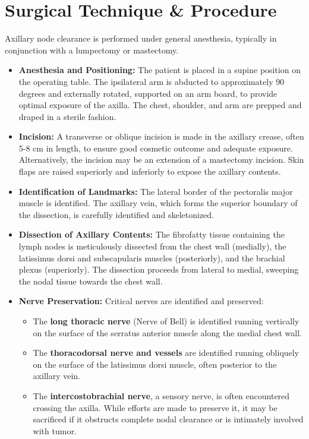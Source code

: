 \section*{Surgical Technique \& Procedure}
Axillary node clearance is performed under general anesthesia, typically in conjunction with a lumpectomy or mastectomy.

\begin{itemize}
  \item \textbf{Anesthesia and Positioning:} The patient is placed in a supine position on the operating table. The ipsilateral arm is abducted to approximately 90 degrees and externally rotated, supported on an arm board, to provide optimal exposure of the axilla. The chest, shoulder, and arm are prepped and draped in a sterile fashion.
  \item \textbf{Incision:} A transverse or oblique incision is made in the axillary crease, often 5-8 cm in length, to ensure good cosmetic outcome and adequate exposure. Alternatively, the incision may be an extension of a mastectomy incision. Skin flaps are raised superiorly and inferiorly to expose the axillary contents.
  \item \textbf{Identification of Landmarks:} The lateral border of the pectoralis major muscle is identified. The axillary vein, which forms the superior boundary of the dissection, is carefully identified and skeletonized.
  \item \textbf{Dissection of Axillary Contents:} The fibrofatty tissue containing the lymph nodes is meticulously dissected from the chest wall (medially), the latissimus dorsi and subscapularis muscles (posteriorly), and the brachial plexus (superiorly). The dissection proceeds from lateral to medial, sweeping the nodal tissue towards the chest wall.
  \item \textbf{Nerve Preservation:} Critical nerves are identified and preserved:
    \begin{itemize}
      \item The \textbf{long thoracic nerve} (Nerve of Bell) is identified running vertically on the surface of the serratus anterior muscle along the medial chest wall.
      \item The \textbf{thoracodorsal nerve and vessels} are identified running obliquely on the surface of the latissimus dorsi muscle, often posterior to the axillary vein.
      \item The \textbf{intercostobrachial nerve}, a sensory nerve, is often encountered crossing the axilla. While efforts are made to preserve it, it may be sacrificed if it obstructs complete nodal clearance or is intimately involved with tumor.

\end{itemize}
\end{itemize}
